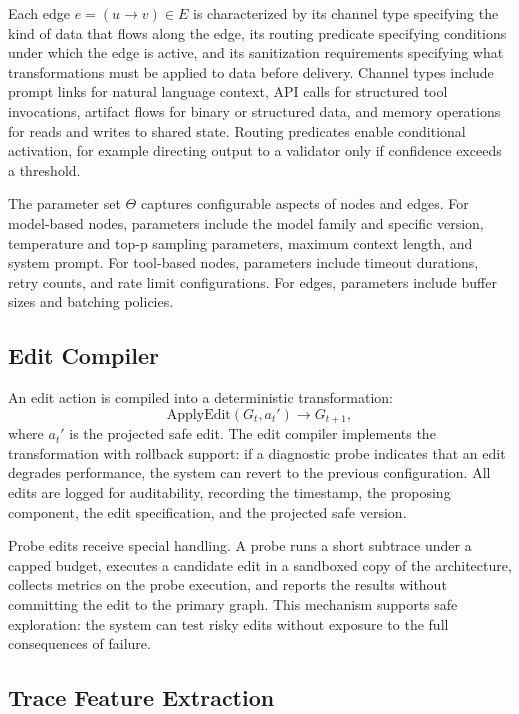 \documentclass[sigconf,anonymous]{acmart}
\begin{document}
Each edge $e = (u \to v) \in E$ is characterized by its channel type specifying the kind of data that flows along the edge, its routing predicate specifying conditions under which the edge is active, and its sanitization requirements specifying what transformations must be applied to data before delivery. Channel types include prompt links for natural language context, API calls for structured tool invocations, artifact flows for binary or structured data, and memory operations for reads and writes to shared state. Routing predicates enable conditional activation, for example directing output to a validator only if confidence exceeds a threshold.

The parameter set $\Theta$ captures configurable aspects of nodes and edges. For model-based nodes, parameters include the model family and specific version, temperature and top-p sampling parameters, maximum context length, and system prompt. For tool-based nodes, parameters include timeout durations, retry counts, and rate limit configurations. For edges, parameters include buffer sizes and batching policies.

\subsection{Edit Compiler}

An edit action is compiled into a deterministic transformation:
\begin{equation}
\text{ApplyEdit}(G_t, a_t') \to G_{t+1},
\end{equation}
where $a_t'$ is the projected safe edit. The edit compiler implements the transformation with rollback support: if a diagnostic probe indicates that an edit degrades performance, the system can revert to the previous configuration. All edits are logged for auditability, recording the timestamp, the proposing component, the edit specification, and the projected safe version.

Probe edits receive special handling. A probe runs a short subtrace under a capped budget, executes a candidate edit in a sandboxed copy of the architecture, collects metrics on the probe execution, and reports the results without committing the edit to the primary graph. This mechanism supports safe exploration: the system can test risky edits without exposure to the full consequences of failure.

\subsection{Trace Feature Extraction}
\end{document}
